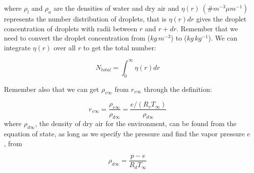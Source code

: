 \documentclass[12pt]{article}
\begin{document}
\noindent
where $\rho_l$ and $\rho_a$ are the densities of water and dry air and
$\eta (r)~(\# m^{-3} \mu m^{-1})$ represents the number distribution
of droplets, that is $\eta (r) dr$ gives the droplet concentration of
droplets with radii between $r$ and $r + dr$.  Remember that we need
to convert the droplet concentration from ($kg\,m^{-3}$) to
($kg\,kg^{-1}$).  We can integrate $\eta(r)$ over all $r$ to get the
total number:

\begin{equation}
  \label{integ}
  N_{total} = \int_0^\infty \eta(r) dr
\end{equation}


Remember also that we can get $\rho_{v \infty}$ from $r_{v \infty}$ through
the definition:

\begin{equation}
  \label{definition}
  r_{v \infty}= \frac{\rho_{v \infty}}{\rho_{d \infty}} = \frac{e/(R_v T_\infty)}{\rho_{d \infty}}
\end{equation}
where $\rho_{d \infty}$, the density of dry air for the environment, can
be found from the equation of state, as long as we specify the pressure
and find the vapor pressure $e$, from 

\begin{equation}
  \label{eq:state}
  \rho_{d \infty} = \frac{p - e}{R_d T_\infty}
\end{equation}
\end{document}
